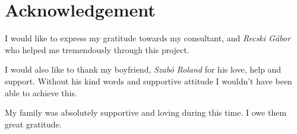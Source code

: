 \chapter*{Acknowledgement}

I would like to express my gratitude towards my consultant, \emph{\vikkonzulens} and \emph{Recski G\'abor} who helped me tremendously through this project.

I would also like to thank my boyfriend, \emph{Szab\'o Roland} for his love, help and support. Without his kind words and supportive attitude I wouldn't have been able to achieve this.

My family was absolutely supportive and loving during this time. I owe them great gratitude.